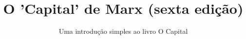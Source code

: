 \documentclass{novel}
\title     {O 'Capital' de Marx (sexta edição)}
\subtitle  {Uma introdução simples ao livro O Capital}
\begin{document}
\toc


\end{document}
